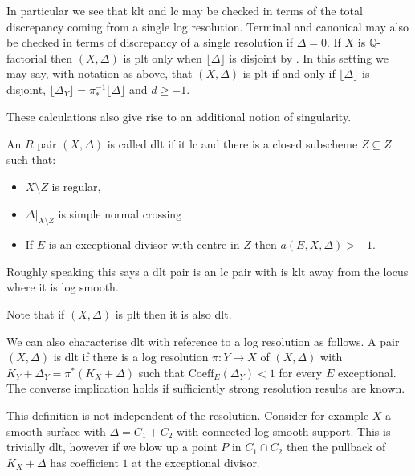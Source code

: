 In particular we see that klt and lc may be checked in terms of the total discrepancy coming from a single log resolution. Terminal and canonical may also be checked in terms of discrepancy of a single resolution if $\Delta=0$. If $X$ is $\mathbb{Q}$-factorial then $(X,\Delta)$ is plt only when $\lfloor \Delta \rfloor$ is disjoint by \cite[Lemma 2.28]{bhatt2020}. In this setting we may say, with notation as above, that $(X,\Delta)$ is plt if and only if $\lfloor \Delta \rfloor$ is disjoint, $\lfloor \Delta_{Y} \rfloor=\pi_{*}^{-1}\lfloor \Delta \rfloor$ and $d \geq -1$.

These calculations also give rise to an additional notion of singularity.

\begin{definition}
	An $R$ pair $(X,\Delta)$ is called dlt if it lc and there is a closed subscheme $Z \subseteq Z$ such that:
	
	\begin{itemize}
		\item $X\setminus Z$ is regular, 
		\item $\Delta|_{X\setminus Z}$ is simple normal crossing
		\item If $E$ is an exceptional divisor with centre in $Z$ then $a(E,X,\Delta) > -1$.
	\end{itemize}
	
	
	 
\end{definition}

Roughly speaking this says a dlt pair is an lc pair with is klt away from the locus where it is log smooth.

Note that if $(X,\Delta)$ is plt then it is also dlt. 

\begin{remark}
	
	We can also characterise dlt with reference to a log resolution as follows. A pair $(X,\Delta)$ is dlt if there is a log resolution $\pi\colon Y \to X$ of $(X,\Delta)$ with $K_{Y}+\Delta_{Y}=\pi^{*}(K_{X}+\Delta)$ such that $\text{Coeff}_{E}(\Delta_{Y}) < 1$ for every $E$ exceptional. The converse implication holds if sufficiently strong resolution results are known. 
	
	This definition is not independent of the resolution. Consider for example $X$ a smooth surface with $\Delta=C_{1}+C_{2}$ with connected log smooth support. This is trivially dlt, however if we blow up a point $P$ in $C_{1}\cap C_{2}$ then the pullback of $K_{X}+\Delta$ has coefficient $1$ at the exceptional divisor.

\end{remark}

